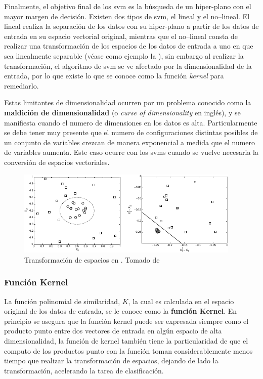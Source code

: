 Finalmente, el objetivo final de los \gls{svm} es la búsqueda de un hiper-plano con el mayor margen de decisión. Existen dos tipos de \gls{svm}, el lineal y el no--lineal. El lineal realiza la separación de los datos con su hiper-plano a partir de los datos de entrada en su espacio vectorial original, mientras que el no--lineal consta de realizar una transformación de los espacios de los datos de entrada a uno en que sea linealmente separable (véase como ejemplo la ), sin embargo al realizar la transformación, el algoritmo de \gls{svm} se ve afectado por la dimensionalidad de la entrada, por lo que existe lo que se conoce como la función \emph{kernel} para remediarlo.

Estas limitantes de dimensionalidad ocurren por un problema conocido como la \textbf{maldición de dimensionalidad} (o \textsl{curse of dimensionality} en inglés), y se manifiesta cuando el numero de dimensiones en los datos es alta. Particularmente se debe tener muy presente que el numero de configuraciones distintas posibles de un conjunto de variables crezcan de manera exponencial a medida que el numero de variables aumenta. Este caso ocurre con los \glspl{svm} cuando se vuelve necesaria la conversión de espacios vectoriales.

\begin{figure}[H]
   \centering
   \includegraphics[width=0.95\textwidth]{Figures/svm-nonlinear-transform.pdf}
   \decoRule
   \caption[Transformación de espacios en ]{Transformación de espacios en . Tomado de \cite{tan2005introduction}}
   \label{fig:svm-nonlinear-transforms}
\end{figure}

\subsubsection{Función Kernel}
La función polinomial de similaridad, $K$, la cual es calculada en el espacio original de los datos de entrada, se le conoce como la \textbf{función Kernel}. En principio se asegura que la función kernel puede ser expresada siempre como el producto punto entre dos vectores de entrada en algún espacio de alta dimensionalidad, la función de kernel también tiene la particularidad de que el computo de los productos punto con la función toman considerablemente menos tiempo que realizar la transformación de espacios, dejando de lado la transformación, acelerando la tarea de clasificación.

